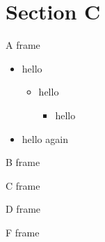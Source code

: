 \documentclass{beamer}
\begin{document}
\section{Section C}
\begin{frame}{A frame}
\begin{itemize}
\item hello
\begin{itemize}
\item hello
\begin{itemize}
\item hello
\end{itemize}
\end{itemize}
\item hello again
\end{itemize}
\end{frame}
\begin{frame}{B frame}
\end{frame}
\begin{frame}{C frame}
\end{frame}
\begin{frame}{D frame}
\end{frame}
\begin{frame}{F frame}
\end{frame}
\end{document}
